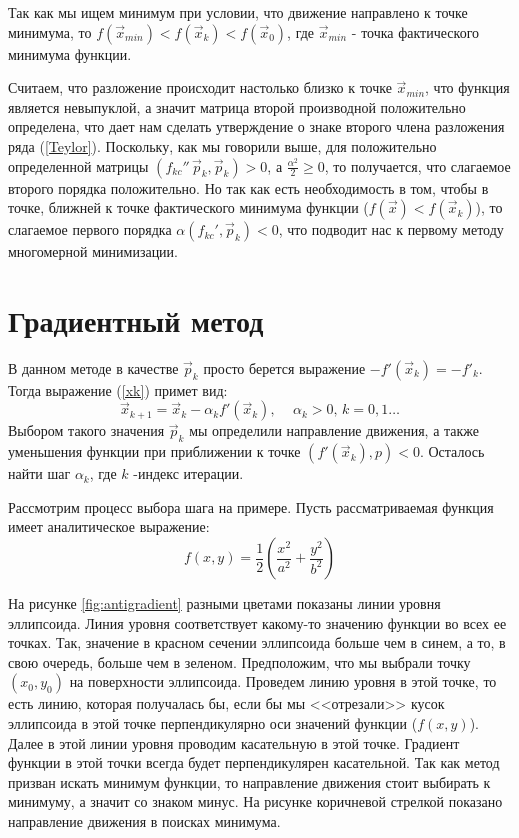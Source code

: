 Так как мы ищем минимум при условии, что движение направлено к точке минимума, то $f(\vec x_{min}) < f(\vec x_k) < f(\vec x_0)$, где $\vec x_{min}$ - точка фактического минимума функции. 

Считаем, что разложение происходит настолько близко к точке $\vec x_{min}$, что функция является невыпуклой, а значит матрица второй производной положительно определена, что дает нам сделать утверждение о знаке второго члена разложения ряда (\ref{Teylor}). Поскольку, как мы говорили выше, для положительно определенной матрицы $\left(f_{kc}'' \, \vec p_k,\vec p_k\right) > 0$, а $\frac{\alpha^2}{2} \geqslant 0$, то получается, что слагаемое второго порядка положительно. Но так как есть необходимость в том, чтобы в точке, ближней к точке фактического минимума функции ($f(\vec x) < f(\vec x_k)$), то слагаемое первого порядка $\alpha(f_{kc}',\vec p_k) < 0$, что подводит нас к первому методу многомерной минимизации.

\section{Градиентный метод} \label{GradientMethod}
В данном методе в качестве $\vec p_k$ просто берется выражение $-f'(\vec x_k) = -f'_k$. Тогда выражение (\ref{xk}) примет вид:
\begin{equation}
    \vec x_{k+1} = \vec x_k - \alpha_k f'(\vec x_k) \textbf{, } \quad \alpha_k > 0 \text{, } k = 0, 1 \ldots
\end{equation}
Выбором такого значения $\vec p_k$ мы определили направление движения, а также уменьшения функции при приближении к точке $(f'(\vec x_k), p) < 0$. Осталось найти шаг $\alpha_k$, где $k$ -индекс итерации.

Рассмотрим процесс выбора шага на примере.
Пусть рассматриваемая функция имеет аналитическое выражение:\
\begin{equation}
    f(x,y) = \frac12\left(\frac{x^2}{a^2} + \frac{y^2}{b^2}\right)
    \label{ellipse}
\end{equation}

На рисунке \ref{fig:antigradient} разными цветами показаны линии уровня эллипсоида. Линия уровня соответствует какому-то значению функции во всех ее точках. Так, значение в красном сечении эллипсоида больше чем в синем, а то, в свою очередь, больше чем в зеленом. Предположим, что мы выбрали точку $(x_0, y_0)$ на поверхности эллипсоида. Проведем линию уровня в этой точке, то есть линию, которая получалась бы, если бы мы <<отрезали>> кусок эллипсоида в этой точке перпендикулярно оси значений функции ($f(x,y)$). Далее в этой линии уровня проводим касательную в этой точке. Градиент функции в этой точки всегда будет перпендикулярен касательной. Так как метод призван искать минимум функции, то направление движения стоит выбирать к минимуму, а значит со знаком минус. На рисунке коричневой стрелкой показано направление движения в поисках минимума. 


